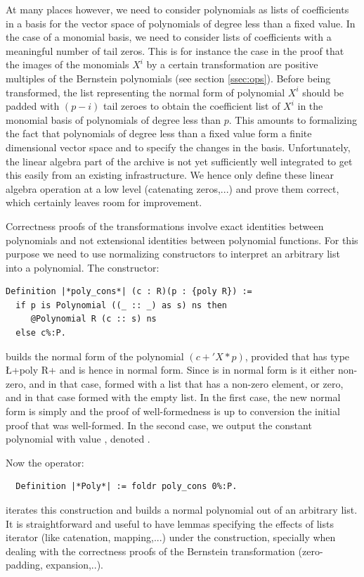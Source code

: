 \documentclass{mscs}
\begin{document}
At many places however, we need to consider polynomials as lists of
coefficients in a basis for the vector space of polynomials of degree
less than a fixed value. In the case of a monomial basis, we need to
consider lists of coefficients with a meaningful number of tail
zeros. This is for instance the case in the proof that the images of
the monomials \(X^i\) by a certain transformation are positive
multiples of the Bernstein polynomials (see section \ref{ssec:ops}).
Before being transformed, the list representing the normal form of
polynomial \(X^i\) should be padded with $(p - i)$ tail zeroes to
obtain the coefficient list of \(X^i\) in the monomial basis of
polynomials of degree less than $p$. This
amounts to formalizing the fact that polynomials of degree less than a
fixed value form a finite dimensional vector space and to specify the
changes in the basis. Unfortunately, the linear algebra part of the
\ssr{} archive is not yet sufficiently well integrated to get this
easily from an existing infrastructure. We hence only define these
linear algebra operation at a low level (catenating zeros,...) and
prove them correct, which certainly leaves room for improvement.

Correctness proofs  of the transformations involve exact identities
between
polynomials and not extensional identities between polynomial
functions. For this purpose we need to use normalizing constructors to
interpret an arbitrary list into a polynomial. The constructor:

\begin{lstlisting}
Definition |*poly_cons*| (c : R)(p : {poly R}) :=
  if p is Polynomial ((_ :: _) as s) ns then
     @Polynomial R (c :: s) ns
  else c%:P.
\end{lstlisting}
builds the normal form of the polynomial $(c + 'X*p)$, provided that
 has type \L+{poly R}+ and is hence in normal form. Since 
is in normal form is it either non-zero, and in that case, formed with
a list  that has a non-zero element, or zero, and in that case formed
with the empty list. In the first case, the new normal form is simply
 and the proof of well-formedness is up to conversion the
initial proof that  was well-formed. In the second case, we
output the constant polynomial with value , denoted .

Now the operator:
\begin{lstlisting}
  Definition |*Poly*| := foldr poly_cons 0%:P.
\end{lstlisting}
iterates this construction and builds a normal polynomial out of an
arbitrary list. It is straightforward and useful to have lemmas
specifying the effects of lists iterator (like catenation,
mapping,...) under the  construction, specially when dealing
with the correctness proofs of the Bernstein transformation
(zero-padding, expansion,..).
\end{document}
